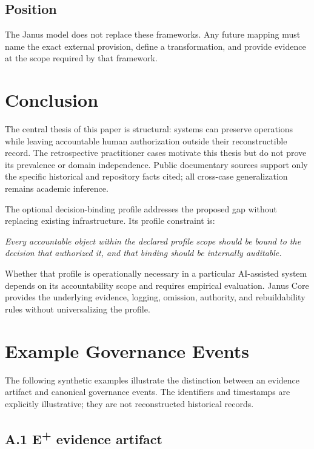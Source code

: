 \documentclass[conference]{IEEEtran}
\begin{document}
\subsection{Position}

The Janus model does not replace these frameworks. Any future mapping must name
the exact external provision, define a transformation, and provide evidence at
the scope required by that framework.

\section{Conclusion}

The central thesis of this paper is structural: systems can preserve operations
while leaving accountable human authorization outside their reconstructible
record. The retrospective practitioner cases motivate this thesis but do not
prove its prevalence or domain independence. Public documentary sources support
only the specific historical and repository facts cited; all cross-case
generalization remains academic inference.

The optional decision-binding profile addresses the proposed gap without
replacing existing infrastructure. Its profile constraint is:

\medskip
\noindent\emph{Every accountable object within the declared profile scope should
be bound to the decision that authorized it, and that binding should be
internally auditable.}

\medskip
Whether that profile is operationally necessary in a particular AI-assisted
system depends on its accountability scope and requires empirical evaluation.
Janus Core provides the underlying evidence, logging, omission, authority, and
rebuildability rules without universalizing the profile.

\clearpage
\appendices
\section{Example Governance Events}
\label{app:events}

The following synthetic examples illustrate the distinction between an evidence
artifact and canonical governance events. The identifiers and timestamps are
explicitly illustrative; they are not reconstructed historical records.

\subsection*{A.1 E\textsuperscript{+} evidence artifact}
\end{document}

